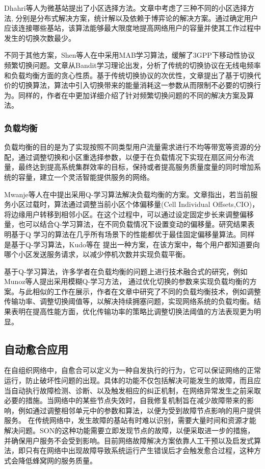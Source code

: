 ﻿\documentclass[11pt,draftclsnofoot,onecolumn,journal,letterpaper]{IEEEtran}
\begin{document}
Dhahri等人\cite{Dhahri2014}为微基站提出了小区选择方法。文章中考虑了三种不同的小区选择方法, 分别是分布式解决方案，统计解以及依赖于博弈论的解决方案。通过确定用户应该连接哪些基站，该算法能够最大限度地提高网络用户的容量并使其工作过程中发生的切换次数最少。

不同于其他方案，Shen等人在\cite{Shen2017}中采用MAB学习算法，缓解了3GPP下移动性协议频繁切换问题。文章从Bandit学习理论出发，分析了传统的切换协议在无线电频率和负载均衡方面的贪心性质。基于传统切换协议的次优性，文章提出了基于切换代价的切换算法，算法中引入切换带来的能量消耗这一参数从而限制不必要的切换行为。同样的，作者在\cite{Shen2016}中更加详细介绍了针对频繁切换问题的不同的解决方案及算法。



\subsubsection{负载均衡}

负载均衡的目的是为了实现按照不同类型用户流量需求进行不均等带宽等资源的分配，通过调整切换和小区重选择参数，以便于在负载情况下实现在扇区间分布流量，最终达到提高系统集群效率的目标，保持或者提高服务质量度量的同时增加系统的容量，建立一个灵活智能提供服务的网络。


Mwanje等人在\cite{Mwanje2013}中提出采用Q-学习算法解决负载均衡的方案。文章指出，若当前服务小区过载时，算法通过调整当前小区个体偏移量(Cell Individual Offsets,CIO)，将边缘用户转移到相邻小区。在这个过程中，可以通过设定固定步长来调整偏移量，也可以结合Q-学习算法，在不同负载情况下设置变动的偏移量。研究结果表明基于Q 学习的算法在几乎所有场景下的性能都优于最佳固定偏移量算法。同样是基于Q-学习算法，Kudo等在\cite{Kudo2014} 提出一种方案，在该方案中，每个用户都知道要向哪个小区发送服务请求，以减少停机次数并实现负载平衡。

基于Q-学习算法，许多学者在负载均衡的问题上进行技术融合式的研究，例如Munoz等人\cite{Munoz2011}提出采用模糊Q-学习方法， 通过优化切换的参数来实现负载均衡的方案。与此相似的工作在\cite{Munoz2013}展示，作者在文章中研究了不同的负载均衡技术，例如调整传输功率、调整切换阈值等，以解决持续拥塞问题，实现网络系统的负载均衡。结果表明在提高性能方面，优化传输功率的策略比调整切换法阈值的方法表现更为明显。


\subsection{自动愈合应用}

在自组织网络中，自愈合可以定义为一种自发执行的行为，它可以保证网络的正常运行，防止破坏性问题的出现。具体的功能不仅包括解决可能发生的故障，而且应当自动执行故障检测、诊断、以及触发相应的纠正机制，在网络异常发生之前采取必要的措施。当网络中的某些节点失效时，自我修复机制旨在减少故障带来的影响，例如通过调整相邻单元中的参数和算法，以便为受到故障节点影响的用户提供服务。 在传统网络中，发生故障的基站有时难以识别，需要大量时间和资源才能解决问题。SON的这种功能需要立即发现节点的故障，以便采取进一步的措施，并确保用户服务不会受到影响。目前网络故障解决方案依靠人工干预以及启发式算法，即只有在网络中出现故障导致系统运行产生错误后才会触发愈合过程，这种方式会降低蜂窝网的服务质量。
\end{document}
